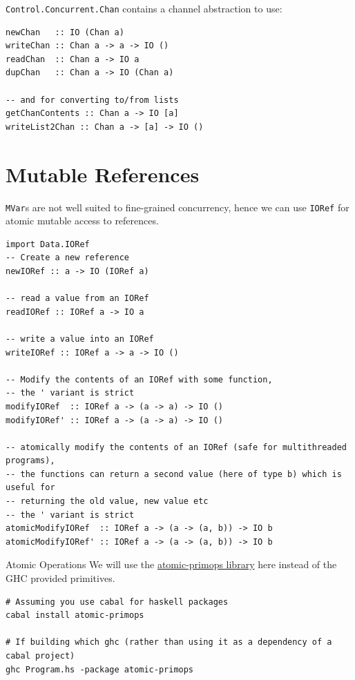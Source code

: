\noindent \texttt{Control.Concurrent.Chan} contains a channel abstraction to use:
\begin{verbatim}
newChan   :: IO (Chan a)
writeChan :: Chan a -> a -> IO ()
readChan  :: Chan a -> IO a
dupChan   :: Chan a -> IO (Chan a)

-- and for converting to/from lists
getChanContents :: Chan a -> IO [a]
writeList2Chan :: Chan a -> [a] -> IO ()
\end{verbatim}

\section{Mutable References}
\texttt{MVar}s are not well suited to fine-grained concurrency, hence we can use \texttt{IORef} for atomic mutable access to references.
\begin{verbatim}
import Data.IORef
-- Create a new reference
newIORef :: a -> IO (IORef a)

-- read a value from an IORef
readIORef :: IORef a -> IO a

-- write a value into an IORef
writeIORef :: IORef a -> a -> IO ()

-- Modify the contents of an IORef with some function, 
-- the ' variant is strict
modifyIORef  :: IORef a -> (a -> a) -> IO ()
modifyIORef' :: IORef a -> (a -> a) -> IO ()

-- atomically modify the contents of an IORef (safe for multithreaded programs), 
-- the functions can return a second value (here of type b) which is useful for 
-- returning the old value, new value etc
-- the ' variant is strict
atomicModifyIORef  :: IORef a -> (a -> (a, b)) -> IO b
atomicModifyIORef' :: IORef a -> (a -> (a, b)) -> IO b
\end{verbatim}

\begin{sidenotebox}{Atomic Operations}
	We will use the \href{https://hackage.haskell.org/package/atomic-primops}{atomic-primops library} here instead of the GHC provided primitives.
	\begin{verbatim}
# Assuming you use cabal for haskell packages
cabal install atomic-primops

# If building which ghc (rather than using it as a dependency of a cabal project)
ghc Program.hs -package atomic-primops
    \end{verbatim}
\end{sidenotebox}

